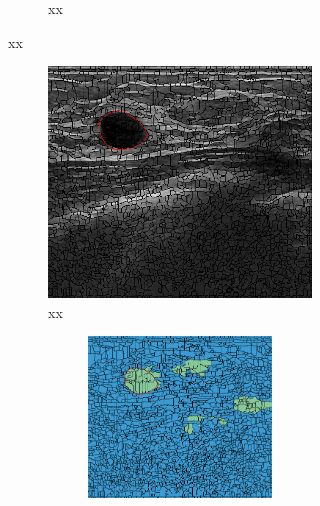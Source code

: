 \begin{figure}[h]
\begin{subfigure}[b]{0.4\textwidth}
\begin{subfigure}[b]{0.48\textwidth}
          \caption{xx}
          \label{fig:results:perfect}
      \end{subfigure}
    \end{subfigure}
    \hfill
    \begin{subfigure}[b]{0.45\textwidth}
      \begin{subfigure}[b]{0.65\textwidth}
          \includegraphics[width=\textwidth]{fporigin}
          \caption{xx}
      \end{subfigure}
      \hfill
      \begin{subfigure}[b]{0.28\textwidth}
        \begin{subfigure}[b]{\textwidth}
            \includegraphics[width=\textwidth]{fpnohom}

\end{subfigure}
\end{subfigure}
\end{subfigure}
\end{figure}

